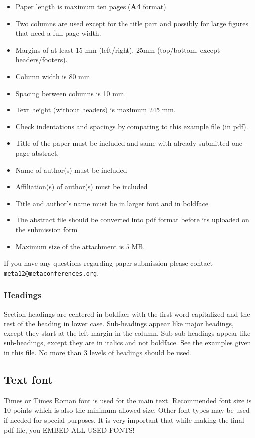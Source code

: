 \documentclass{article}
\begin{document}
\begin{itemize}
\setlength{\itemsep}{-1mm}
\item Paper length is maximum ten pages ({\bf A4} format)
\item Two columns are used except for the title part and possibly for large figures that need a full page width.
\item Margins of at least 15 mm (left/right), 25mm (top/bottom, except headers/footers).
\item Column width is 80 mm.
\item Spacing between columns is 10 mm.
\item Text height (without headers) is maximum 245 mm.
\item Check indentations and spacings by comparing to this example file (in pdf).
\item Title of the paper must be included and same with already submitted one-page abstract.
\item Name of author(s) must be included
\item Affiliation(s) of author(s) must be included
\item Title and author's name must be in larger font and in boldface
\item The abstract file should be converted into pdf format before its uploaded on the submission form
\item Maximum size of the attachment is 5 MB.
\end{itemize}

If you have any questions regarding paper submission please contact {\tt \small meta12@metaconferences.org}. 

\subsubsection{Headings}

Section headings are centered in boldface with the first word capitalized and the rest of the heading in lower case. 
Sub-headings appear like major headings, except they start at the left margin in the column.
Sub-sub-headings appear like sub-headings, except they are in italics and not boldface. 
See the examples given in this  file. 
No more than 3 levels of headings should be used.

\subsection{Text font}

Times or Times Roman font is used for the main text. 
Recommended font size is 10 points which is also the minimum allowed size. 
Other font types may be used if needed for special purposes. 
It is very important that while making the final pdf file, you EMBED ALL USED FONTS!
\end{document}
